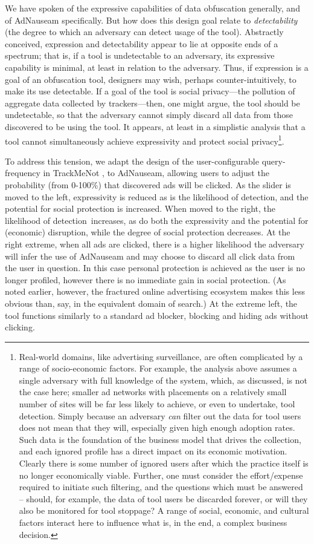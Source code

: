 \documentclass[conference]{IEEEtran}
\begin{document}
We have spoken of the expressive capabilities of data obfuscation generally, and of AdNauseam specifically. But how does this design goal relate to \emph{detectability} (the degree to which an adversary can detect usage of the tool). Abstractly conceived, expression and detectability appear to lie at opposite ends of a spectrum; that is, if a tool is undetectable to an adversary, its expressive capability is minimal, at least in relation to the adversary. Thus, if expression is a goal of an obfuscation tool, designers may wish, perhaps counter-intuitively, to make its use detectable. If a goal of the tool is social privacy---the pollution of aggregate data collected by trackers---then, one might argue, the tool should be undetectable, so that the adversary cannot simply discard all data from those discovered to be using the tool. It appears, at least in a simplistic analysis that a tool cannot simultaneously achieve expressivity and protect social privacy\footnote{Real-world domains, like advertising surveillance, are often complicated by a range of socio-economic factors. For example, the analysis above assumes a single adversary with full knowledge of the system, which, as discussed, is not the case here; smaller ad networks with placements on a relatively small number of sites will be far less likely to achieve, or even to undertake, tool detection. Simply because an adversary \emph{can} filter out the data for tool users does not mean that they will, especially given high enough adoption rates. Such data is the foundation of the business model that drives the collection, and each ignored profile has a direct impact on its economic motivation. Clearly there is some number of ignored users after which the practice itself is no longer economically viable. Further, one must consider the effort/expense required to initiate such filtering, and the questions which must be answered -- should, for example, the data of tool users be discarded forever, or will they also be monitored for tool stoppage? A range of social, economic, and cultural factors interact here to influence what is, in the end, a complex business decision.}.

To address this tension, we adapt the design of the user-configurable query-frequency in TrackMeNot \cite{Howe-1}, to AdNauseam, allowing users to adjust the probability (from 0-100\%) that discovered ads will be clicked. As the slider is moved to the left, expressivity is reduced as is the likelihood of detection, and the potential for social protection is increased. When moved to the right, the likelihood of detection increases, as do both the expressivity and the potential for (economic) disruption, while the degree of social protection decreases. At the right extreme, when all ads are clicked, there is a higher likelihood the adversary will infer the use of AdNauseam and may choose to discard all click data from the user in question. In this case personal protection is achieved as the user is no longer profiled, however there is no immediate gain in social protection. (As noted earlier, however, the fractured online advertising ecosystem makes this less obvious than, say, in the equivalent domain of search.) At the extreme left, the tool functions similarly to a standard ad blocker, blocking and hiding ads without clicking.
\end{document}
